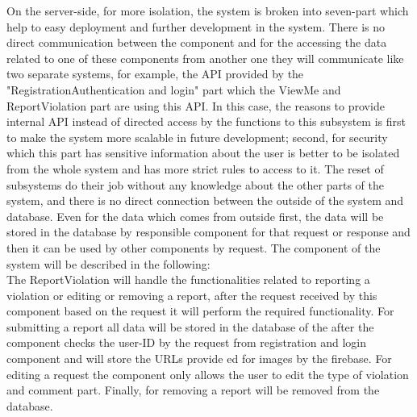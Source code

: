 On the server-side, for more isolation, the system is broken into seven-part which help to easy deployment and further development in the system. There is no direct communication between the component and for the accessing the data related to one of these components from another one they will communicate like two separate systems, for example, the API provided by the "Registration\/Authentication and login" part which the ViewMe and ReportViolation part are using this API. In this case, the reasons to provide internal API instead of directed access by the functions to this subsystem is first to make the system more scalable in future development; second, for security which this part has sensitive information about the user is better to be isolated from the whole system and has more strict rules to access to it. The reset of subsystems do their job without any knowledge about the other parts of the system, and there is no direct connection between the outside of the system and database. Even for the data which comes from outside first, the data will be stored in the database by responsible component for that request or response and then it can be used by other components by request. The component of the system will be described in the following:\\

The ReportViolation will handle the functionalities related to reporting a violation or editing or removing a report, after the request received by this component based on the request it will perform the required functionality. For submitting a report all data will be stored in the database of the after the component checks the user-ID by the request from registration and login component and will store the URLs provide ed for images by the firebase. For editing a request the component only allows the user to edit the type of violation and comment part. Finally, for removing a report will be removed from the database.\\

